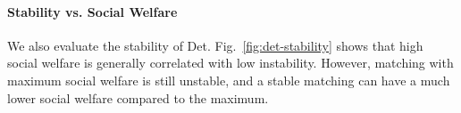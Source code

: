 
\paragraph{Stability vs. Social Welfare} We also evaluate the stability of Det. Fig.~\ref{fig:det-stability} shows that high social welfare is generally correlated with low instability. However, matching with maximum social welfare is still unstable, and a stable matching can have a much lower social welfare compared to the maximum.
